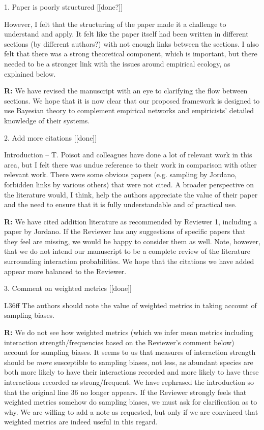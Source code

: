 \documentclass[12pt]{letter}
\newenvironment{refquote}{\bigskip \begin{it}}{\end{it}\smallskip}
\begin{document}
	1. Paper is poorly structured [[done?]]

		\begin{refquote}
		However, I felt that the structuring of the paper made it a challenge to understand and apply. It felt like the paper itself had been written in different sections (by different authors?) with not enough links between the sections. I also felt that there was a strong theoretical component, which is important, but there needed to be a stronger link with the issues around empirical ecology, as explained below.
		\end{refquote}

		\textbf{R:} We have revised the manuscript with an eye to clarifying the flow between sections. We hope that it is now clear that our proposed framework is designed to use Bayesian theory to complement empirical networks and empiricists' detailed knowledge of their systems. 


	2. Add more citations [[done]]

		\begin{refquote}
		Introduction – T. Poisot and colleagues have done a lot of relevant work in this area, but I felt there was undue reference to their work in comparison with other relevant work. There were some obvious papers (e.g. sampling by Jordano, forbidden links by various others) that were not cited. A broader perspective on the literature would, I think, help the authors appreciate the value of their paper and the need to ensure that it is fully understandable and of practical use.
		\end{refquote}

		\textbf{R:} We have cited addition literature as recommended by Reviewer 1, including a paper by Jordano. If the Reviewer has any suggestions of specific papers that they feel are missing, we would be happy to consider them as well. Note, however, that we do not intend our manuscript to be a complete review of the literature surrounding interaction probabilities. We hope that the citations we have added appear more balanced to the Reviewer.


	3. Comment on weighted metrics [[done]]

		\begin{refquote}
		L36ff The authors should note the value of weighted metrics in taking account of sampling biases.
		\end{refquote}

		\textbf{R:} We do not see how weighted metrics (which we infer mean metrics including interaction strength/frequencies based on the Reviewer's comment below) account for sampling biases. It seems to us that measures of interaction strength should be \emph{more} susceptible to sampling biases, not less, as abundant species are both more likely to have their interactions recorded and more likely to have these interactions recorded as strong/frequent. We have rephrased the introduction so that the original line 36 no longer appears. If the Reviewer strongly feels that weighted metrics somehow do sampling biases, we must ask for clarification as to why. We are willing to add a note as requested, but only if we are convinced that weighted metrics are indeed useful in this regard.
\end{document}
